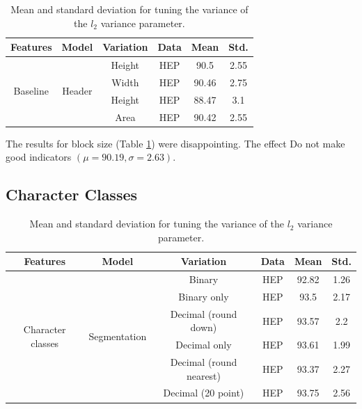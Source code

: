 \begin{table}[h]
\begin{center}
\begin{tabular}{|c|c|c|c|c|c|}
\hline
Features & Model & Variation & Data & Mean & Std.\\
\hline
\multirow{4}{*}{Baseline} & \multirow{4}{*}{Header} & Height & HEP & 90.5 & 2.55\\\cline{3-6}
& & Width & HEP & 90.46 & 2.75\\\cline{3-6}
& & Height & HEP  & 88.47 & 3.1\\\cline{3-6}
& & Area & HEP  & 90.42 & 2.55\\\cline{3-6}
\hline
\end{tabular}
\caption[Mean and standard deviation for tuning the variance of the $l_2$ variance parameter.]{Mean and standard deviation for tuning the variance of the $l_2$ variance parameter.}
\label{table:blockshaperesults}
\end{center}
\end{table}

The results for block size (Table \ref{table:blockshaperesults}) were disappointing. The effect  Do not make good indicators $(\mu = 90.19, \sigma = 2.63)$.

\subsection{Character Classes}

\begin{table}[h]
\begin{center}
\begin{tabular}{|c|c|c|c|c|c|}
\hline
Features & Model & Variation & Data & Mean & Std.\\
\hline
\multirow{6}{*}{Character classes} & \multirow{6}{*}{Segmentation} & Binary & HEP & 92.82 & 1.26\\\cline{3-6}
& & Binary only & HEP & 93.5 & 2.17\\\cline{3-6}
& & Decimal (round down) & HEP & 93.57 & 2.2\\\cline{3-6}
& & Decimal only & HEP & 93.61 & 1.99\\\cline{3-6}
& & Decimal (round nearest) & HEP & 93.37 & 2.27\\\cline{3-6}
& & Decimal (20 point) & HEP & 93.75 & 2.56\\\cline{3-6}
\hline
\end{tabular}
\caption[Mean and standard deviation for tuning the variance of the $l_2$ variance parameter.]{Mean and standard deviation for tuning the variance of the $l_2$ variance parameter.}
\label{table:characterclassresults}
\end{center}
\end{table}

